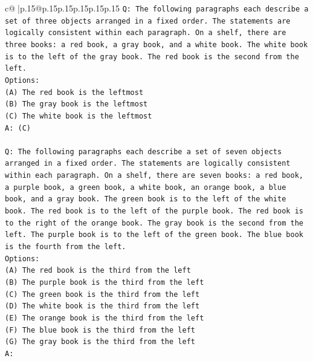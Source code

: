 \documentclass{article}
\begin{document}
{\begin{supertabular}{c@{$\;$}|p{.15\linewidth}@{}p{.15\linewidth}p{.15\linewidth}p{.15\linewidth}p{.15\linewidth}p{.15\linewidth}}
{{{\texttt{Q: The following paragraphs each describe a set of three objects arranged in a fixed order. The statements are logically consistent within each paragraph. On a shelf, there are three books: a red book, a gray book, and a white book. The white book is to the left of the gray book. The red book is the second from the left.} \\
\texttt{Options:} \\
\texttt{(A) The red book is the leftmost} \\
\texttt{(B) The gray book is the leftmost} \\
\texttt{(C) The white book is the leftmost} \\
\texttt{A: (C)} \\
\\ 
\texttt{Q: The following paragraphs each describe a set of seven objects arranged in a fixed order. The statements are logically consistent within each paragraph. On a shelf, there are seven books: a red book, a purple book, a green book, a white book, an orange book, a blue book, and a gray book. The green book is to the left of the white book. The red book is to the left of the purple book. The red book is to the right of the orange book. The gray book is the second from the left. The purple book is to the left of the green book. The blue book is the fourth from the left.} \\
\texttt{Options:} \\
\texttt{(A) The red book is the third from the left} \\
\texttt{(B) The purple book is the third from the left} \\
\texttt{(C) The green book is the third from the left} \\
\texttt{(D) The white book is the third from the left} \\
\texttt{(E) The orange book is the third from the left} \\
\texttt{(F) The blue book is the third from the left} \\
\texttt{(G) The gray book is the third from the left} \\
\texttt{A:} \\
            }
        }
    }
     \\ \\


\end{supertabular}}
\end{document}
